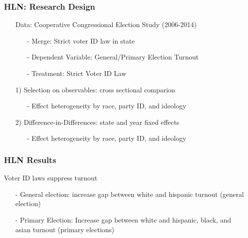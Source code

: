 \documentclass{beamer}
\numberwithin{equation}{section}
\begin{document}
\begin{frame}
\frametitle{HLN: Research Design}

\begin{itemize}
  \item[] \alert{Data}: Cooperative Congressional Election Study (2006-2014) 
    \begin{itemize}
      \item[-] Merge: Strict voter ID law in state
      \item[-] Dependent Variable: General/Primary Election Turnout
      \item[-] Treatment: Strict Voter ID Law
    \end{itemize} 
  \item[1)] Selection on observables: cross sectional comparion
  \begin{itemize}
  \item[-]  Effect heterogeneity by race, party ID, and ideology
\end{itemize}
  \item[2) ] Difference-in-Differences: state and year fixed effects 
  \begin{itemize}
  \item[-]  Effect heterogeneity by race, party ID, and ideology
\end{itemize}
\end{itemize}


\end{frame}


\begin{frame}
\frametitle{HLN Results} 
Voter ID laws suppress turnout 
\begin{itemize}
\item[-] General election:  increase gap between white and hispanic turnout (general election) 
\item[-] Primary Election: Increase gap between white and hispanic, black, and asian turnout (primary elections) 
\end{itemize}


\end{frame}
\end{document}
